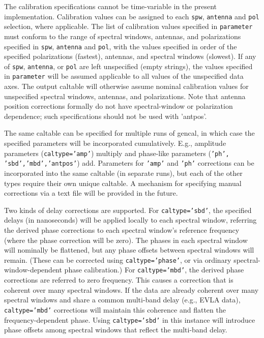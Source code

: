 The calibration specifications cannot be time-variable in the present
implementation.  Calibration values can be assigned to each {\tt spw},
{\tt antenna} and {\tt pol} selection, where applicable.  The list 
of calibration values specified in {\tt parameter} must conform to
the range of spectral windows, antennas, and polarizations specified
in {\tt spw}, {\tt antenna} and {\tt pol}, with the values specified
in order of the specified polarizations (fastest), antennas, and spectral
windows (slowest).  If any of {\tt spw}, 
{\tt antenna}, or {\tt pol} are left unspecified (empty strings), the
values specified in {\tt parameter} will be assumed applicable to
all values of the unspecified data axes. The output caltable will
otherwise assume nominal calibration values for unspecified spectral
windows, antennas, and polarizations.  Note that antenna position
corrections formally do not have spectral-window or polarization
dependence; such specifications should not be used with 'antpos'.

The same caltable can be specified for multiple runs of gencal, in
which case the specified parameters will be incorporated cumulatively.
E.g., amplitude parameters ({\tt caltype='amp'}) multiply and
phase-like parameters ({\tt 'ph', 'sbd','mbd','antpos'}) add.
Parameters for {\tt 'amp'} and {\tt 'ph'} corrections can be
incorporated into the same caltable (in separate runs), but each of
the other types require their own unique caltable.  A mechanism for
specifying manual corrections via a text file will be provided in the
future.

Two kinds of delay corrections are supported.  For {\tt caltype='sbd'},
the specified delays (in nanoseconds) will be applied locally to 
each spectral window, referring the derived phase corrections to
each spectral window's reference frequency (where the phase correction
will be zero).  The phases in each spectral window will nominally be
flattened, but any phase offsets between spectral windows will remain.
(These can be corrected using {\tt caltype='phase'}, or via ordinary
spectral-window-dependent phase calibration.)  For {\tt caltype='mbd'},
the derived phase corrections are referred to zero frequency.  This
causes a correction that is coherent over many spectral windows. 
If the data are already coherent over many spectral windows and share
a common multi-band delay (e.g., EVLA data), {\tt caltype='mbd'} 
corrections will maintain this coherence and flatten the 
frequency-dependent phase.  Using {\tt caltype='sbd'} in this instance
will introduce phase offsets among spectral windows that reflect
the multi-band delay.  

